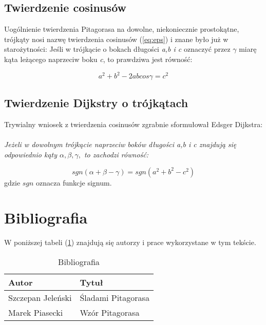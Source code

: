 \documentclass[a4paper]{article}
\begin{document}
\subsection{Twierdzenie cosinusów}
Uogólnienie twierdzenia Pitagorasa na dowolne, niekoniecznie prostokątne, trójkąty
nosi nazwę twierdzenia cosinusów (\ref{eq:eps}) i znane było już w starożytności:
Jeśli w trójkącie o bokach długości \textit{a,b i c} oznaczyć przez $\gamma$ miarę kąta leżącego naprzeciw
boku \textit{c}, to prawdziwa jest równość: 

\begin{equation}
a^{2} + b^{2} - 2\textit{ab}cos\gamma = c^{2}
\label{eq:eps}
\end{equation}

\subsection{Twierdzenie Dijkstry o trójkątach}
Trywialny wniosek z twierdzenia cosinusów zgrabnie sformułował Edsger Dijkstra:\\\\
\emph{Jeżeli w dowolnym trójkącie naprzeciw boków długości a,b i c znajdują się odpowiednio kąty
$\alpha,\beta,\gamma,$ to zachodzi równość: }

\begin{displaymath}
sgn(\alpha+\beta-\gamma) = sgn(a^{2}+b^{2}-c^{2})
\end{displaymath}
\indent gdzie $sgn$ oznacza funkcje signum.

\newpage

\section{Bibliografia}
W poniższej tabeli (\ref{tabela}) znajdują się autorzy i prace wykorzystane w tym tekście.
\begin{table}[h]
\caption{Bibliografia}
\label{tabela}
\begin{center}
\begin{tabular}{|l|l|}
\hline
\textbf{Autor} & \textbf{Tytuł}\\ \hline
Szczepan Jeleński & Śladami Pitagorasa \\ \hline
Marek Piasecki & Wzór Pitagorasa \\ \hline
\end{tabular}
\end{center}
\end{table}



















 
\end{document}
